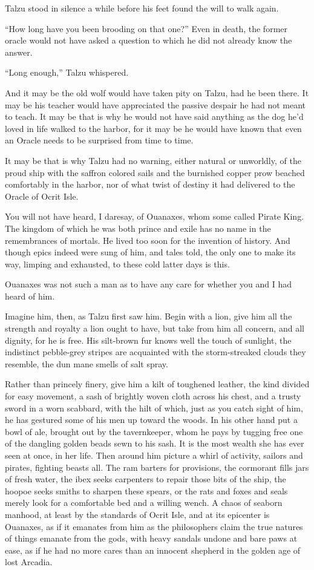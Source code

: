 Talzu stood in silence a while before his feet found the will to walk again.

``How long have you been brooding on that one?'' Even in death, the former oracle would not have asked a question to which he did not already know the answer.

``Long enough,'' Talzu whispered.

And it may be the old wolf would have taken pity on Talzu, had he been there. It may be his teacher would have appreciated the passive despair he had not meant to teach. It may be that is why he would not have said anything as the dog he'd loved in life walked to the harbor, for it may be he would have known that even an Oracle needs to be surprised from time to time.

It may be that is why Talzu had no warning, either natural or unworldly, of the proud ship with the saffron colored sails and the burnished copper prow beached comfortably in the harbor, nor of what twist of destiny it had delivered to the Oracle of Ocrit Isle.

\secdiv

\noindent You will not have heard, I daresay, of Ouanaxes, whom some called Pirate King. The kingdom of which he was both prince and exile has no name in the remembrances of mortals. He lived too soon for the invention of history. And though epics indeed were sung of him, and tales told, the only one to make its way, limping and exhausted, to these cold latter days is this.

Ouanaxes was not such a man as to have any care for whether you and I had heard of him.

Imagine him, then, as Talzu first saw him. Begin with a lion, give him all the strength and royalty a lion ought to have, but take from him all concern, and all dignity, for he is free. His silt-brown fur knows well the touch of sunlight, the indistinct pebble-grey stripes are acquainted with the storm-streaked clouds they resemble, the dun mane smells of salt spray.

Rather than princely finery, give him a kilt of toughened leather, the kind divided for easy movement, a sash of brightly woven cloth across his chest, and a trusty sword in a worn scabbard, with the hilt of which, just as you catch sight of him, he has gestured some of his men up toward the woods. In his other hand put a bowl of ale, brought out by the tavernkeeper, whom he pays by tugging free one of the dangling golden beads sewn to his sash. It is the most wealth she has ever seen at once, in her life. Then around him picture a whirl of activity, sailors and pirates, fighting beasts all. The ram barters for provisions, the cormorant fills jars of fresh water, the ibex seeks carpenters to repair those bits of the ship, the hoopoe seeks smiths to sharpen these spears, or the rats and foxes and seals merely look for a comfortable bed and a willing wench. A chaos of seaborn manhood, at least by the standards of Ocrit Isle, and at its epicenter is Ouanaxes, as if it emanates from him as the philosophers claim the true natures of things emanate from the gods, with heavy sandals undone and bare paws at ease, as if he had no more cares than an innocent shepherd in the golden age of lost Arcadia.


